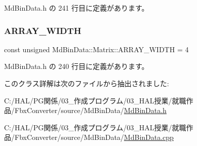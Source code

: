 Md\+Bin\+Data.\+h の 241 行目に定義があります。

\mbox{\label{class_md_bin_data_1_1_matrix_adbf2f2e21df64ab4559b9c98b88a6c59}} 
\subsubsection{\texorpdfstring{A\+R\+R\+A\+Y\+\_\+\+W\+I\+D\+TH}{ARRAY\_WIDTH}}
{\footnotesize\ttfamily const unsigned Md\+Bin\+Data\+::\+Matrix\+::\+A\+R\+R\+A\+Y\+\_\+\+W\+I\+D\+TH = 4\hspace{0.3cm}{\ttfamily [static]}}



 Md\+Bin\+Data.\+h の 240 行目に定義があります。



このクラス詳解は次のファイルから抽出されました\+:\begin{DoxyCompactItemize}
\item 
C\+:/\+H\+A\+L/\+P\+G関係/03\+\_\+作成プログラム/03\+\_\+\+H\+A\+L授業/就職作品/\+Fbx\+Converter/source/\+Md\+Bin\+Data/\mbox{\hyperlink{_md_bin_data_8h}{Md\+Bin\+Data.\+h}}\item 
C\+:/\+H\+A\+L/\+P\+G関係/03\+\_\+作成プログラム/03\+\_\+\+H\+A\+L授業/就職作品/\+Fbx\+Converter/source/\+Md\+Bin\+Data/\mbox{\hyperlink{_md_bin_data_8cpp}{Md\+Bin\+Data.\+cpp}}\end{DoxyCompactItemize}
